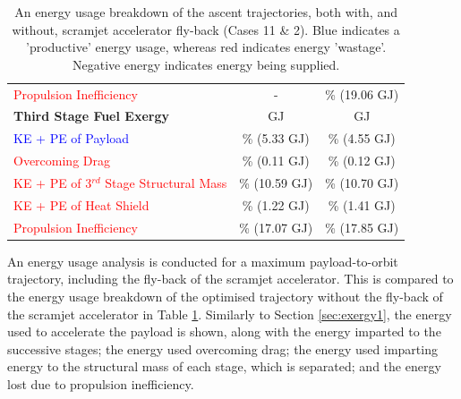 \begin{table}[ht]
\begin{tabular}{l c c}
		\textcolor{red}{Propulsion Inefficiency}  
		& - & \PlossreturnCombinedStandard \% (19.06 GJ)
		\\
		
		
		\textbf{Third Stage Fuel Exergy}  
		& \textbf{\thirdEnergyStandardNoReturn} GJ & \textbf{\thirdEnergyStandard} GJ
		\\
		\textcolor{blue}{KE + PE of Payload}  
		&\thirddExergyEffStandardNoReturn \% (5.33 GJ) &\thirddExergyEffStandard \% (4.55 GJ)
		\\
		\textcolor{red}{Overcoming Drag}  
		& \WDthreeStandardNoReturn \% (0.11 GJ) & \WDthreeStandard \% (0.12 GJ)
		\\
		\textcolor{red}{KE + PE  of 3$^{rd}$ Stage Structural Mass}  
		& \WthreeStandardNoReturn \% (10.59 GJ) & \WthreeStandard \% (10.70 GJ)
		\\
		
		
		
		\textcolor{red}{KE + PE of Heat Shield}  
		
		& \WHSthreeStandardNoReturn \% (1.22 GJ) & \WHSthreeStandard \% (1.41 GJ)
		\\
		
		\textcolor{red}{Propulsion Inefficiency}  
		& \PlossthreeCombinedStandardNoReturn \% (17.07 GJ) & \PlossthreeCombinedStandard \% (17.85 GJ)
		\\
		\hline 
	\end{tabular} 
	\caption{An energy usage breakdown of the ascent trajectories, both with, and without, scramjet accelerator fly-back (Cases 11 \& 2). Blue indicates a 'productive' energy usage, whereas red indicates energy 'wastage'. Negative energy indicates energy being supplied.}
	\label{tab:effStandard}
\end{table}


An energy usage analysis is conducted for a maximum payload-to-orbit trajectory, including the fly-back of the scramjet accelerator. This is compared to the energy usage breakdown of the optimised trajectory without the fly-back of the scramjet accelerator in Table \ref{tab:effStandard}. Similarly to Section \ref{sec:exergy1}, the energy used to accelerate the payload is shown, along with the energy imparted to the successive stages; the energy used overcoming drag; the energy used imparting energy to the structural mass of each stage, which is separated; and the energy lost due to propulsion inefficiency. 


